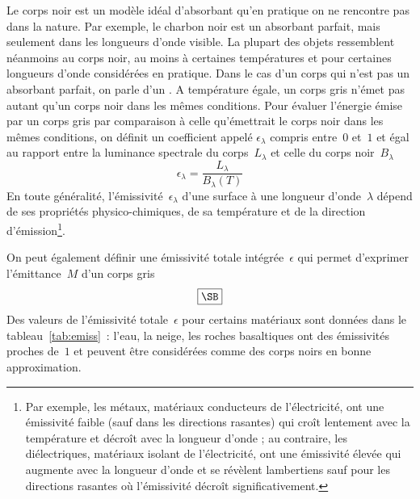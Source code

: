 \sk
Le corps noir est un modèle idéal d'absorbant qu'en pratique on ne rencontre pas dans la nature. Par exemple, le charbon noir est un absorbant parfait, mais seulement dans les longueurs d'onde visible. La plupart des objets ressemblent néanmoins au corps noir, au moins à certaines températures et pour certaines longueurs d'onde considérées en pratique. Dans le cas d'un corps qui n'est pas un absorbant parfait, on parle d'un . A température égale, un corps gris n'émet pas autant qu'un corps noir dans les mêmes conditions. Pour évaluer l'énergie émise par un corps gris par comparaison à celle qu'émettrait le corps noir dans les mêmes conditions, on définit un coefficient appelé  $\epsilon_\lambda$ compris entre~$0$ et~$1$ et égal au rapport entre la luminance spectrale du corps~$L_\lambda$ et celle du corps noir~$B_\lambda$ $$ \epsilon_\lambda=\frac{L_\lambda}{B_\lambda(T)} $$ En toute généralité, l'émissivité~$\epsilon_{\lambda}$ d'une surface à une longueur d'onde~$\lambda$ dépend de ses propriétés physico-chimiques, de sa température et de la direction d'émission\footnote{Par exemple, les métaux, matériaux conducteurs de l'électricité, ont une émissivité faible (sauf dans les directions rasantes) qui croît lentement avec la température et décroît avec la longueur d'onde ; au contraire, les diélectriques, matériaux isolant de l'électricité, ont une émissivité élevée qui augmente avec la longueur d'onde et se révèlent lambertiens sauf pour les directions rasantes où l'émissivité décroît significativement.}.

\sk
On peut également définir une émissivité totale intégrée~$\epsilon$ qui permet d'exprimer l'émittance~$M$ d'un corps gris $$ \boxed{\SB} $$ Des valeurs de l'émissivité totale~$\epsilon$ pour certains matériaux sont données dans le tableau~\ref{tab:emiss}~: l'eau, la neige, les roches basaltiques ont des émissivités proches de~$1$ et peuvent être considérées comme des corps noirs en bonne approximation. 

